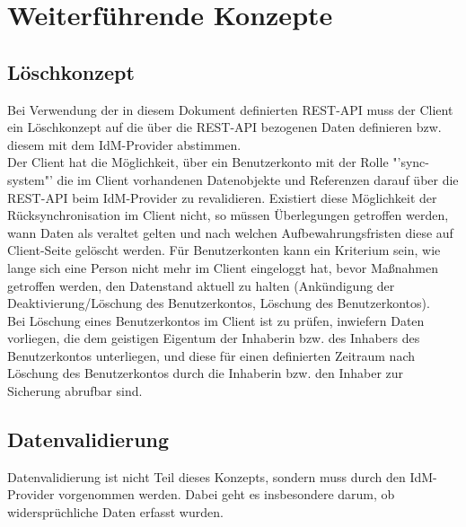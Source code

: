 \chapter{Weiterführende Konzepte}

\section{Löschkonzept}

Bei Verwendung der in diesem Dokument definierten REST-API muss der Client ein Löschkonzept auf die über die REST-API bezogenen Daten definieren bzw. diesem mit dem IdM-Provider abstimmen.\\

Der Client hat die Möglichkeit, über ein Benutzerkonto mit der Rolle "'sync-system"' die im Client vorhandenen Datenobjekte und Referenzen darauf über die REST-API beim IdM-Provider zu revalidieren. 
Existiert diese Möglichkeit der Rücksynchronisation im Client nicht, so müssen Überlegungen getroffen werden, wann Daten als veraltet gelten und nach welchen Aufbewahrungsfristen diese auf Client-Seite gelöscht werden. 
Für Benutzerkonten kann ein Kriterium sein, wie lange sich eine Person nicht mehr im Client eingeloggt hat, bevor Maßnahmen getroffen werden, den Datenstand aktuell zu halten (Ankündigung der Deaktivierung/Löschung des Benutzerkontos, Löschung des Benutzerkontos). \\

Bei Löschung eines Benutzerkontos im Client ist zu prüfen, inwiefern Daten vorliegen, die dem geistigen Eigentum der Inhaberin bzw. des Inhabers des Benutzerkontos unterliegen, und diese für einen definierten Zeitraum nach Löschung des Benutzerkontos durch die Inhaberin bzw. den Inhaber zur Sicherung abrufbar sind.

\section{Datenvalidierung}

Datenvalidierung ist nicht Teil dieses Konzepts, sondern muss durch den IdM-Provider vorgenommen werden. Dabei geht es insbesondere darum, ob widersprüchliche Daten erfasst wurden.